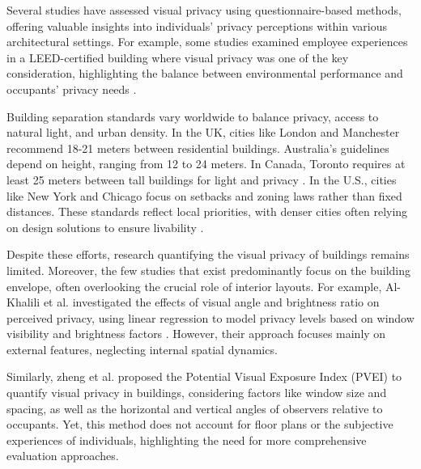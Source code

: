 \documentclass[final,3p,times,review]{elsarticle}
\begin{document}
Several studies have assessed visual privacy using questionnaire-based methods, offering valuable insights into individuals' privacy perceptions within various architectural settings. For example, some studies examined employee experiences in a LEED-certified building where visual privacy was one of the key consideration, highlighting the balance between environmental performance and occupants’ privacy needs \cite{Altomonte2013,Schiavon2014,Guo2021}. 

Building separation standards vary worldwide to balance privacy, access to natural light, and urban density. In the UK, cities like London and Manchester recommend 18-21 meters between residential buildings\cite{ LondonGuidelines, ManchesterGuidelines}. Australia’s guidelines depend on height, ranging from 12 to 24 meters\cite{NSWApartmentDesign}. In Canada, Toronto requires at least 25 meters between tall buildings for light and privacy \cite{TorontoTallBuildings}. In the U.S., cities like New York and Chicago focus on setbacks and zoning laws rather than fixed distances. These standards reflect local priorities, with denser cities often relying on design solutions to ensure livability \cite{ NYCZoning}.

Despite these efforts, research quantifying the visual privacy of buildings remains limited. Moreover, the few studies that exist predominantly focus on the building envelope, often overlooking the crucial role of interior layouts. For example, Al-Khalili et al. investigated the effects of visual angle and brightness ratio on perceived privacy, using linear regression to model privacy levels based on window visibility and brightness factors \cite{alkhalili2018}. However, their approach focuses mainly on external features, neglecting internal spatial dynamics.

Similarly, zheng et al.\cite{zheng2021} proposed the Potential Visual Exposure Index (PVEI) to quantify visual privacy in buildings, considering factors like window size and spacing, as well as the horizontal and vertical angles of observers relative to occupants. Yet, this method does not account for floor plans or the subjective experiences of individuals, highlighting the need for more comprehensive evaluation approaches. 
\end{document}
